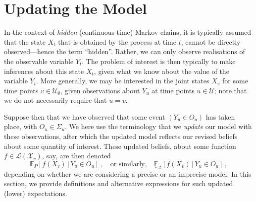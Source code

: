 \documentclass[twoside,11pt]{article}
\newcommand{\states}{\mathcal{X}}
\newcommand{\gambles}{\mathcal{L}}
\begin{document}
\section{Updating the Model}\label{sec:updating_model}

In the context of \emph{hidden} (continuous-time) Markov chains, it is typically assumed that the state $X_t$ that is obtained by the process at time $t$, cannot be directly observed---hence the term ``hidden''. Rather, we can only observe realisations of the observable variable $Y_t$. The problem of interest is then typically to make inferences about this state $X_t$, given what we know about the value of the variable $Y_t$. More generally, we may be interested in the joint states $X_v$ for some time points $v\in\mathcal{U}_\emptyset$, given observations about $Y_u$ at time points $u\in\mathcal{U}$; note that we do not necessarily require that $u=v$.

Suppose then that we have observed that some event $(Y_u\in O_u)$ has taken place, with $O_u\in\Sigma_u$. We here use the terminology that we \emph{update} our model with these observations, after which the updated model reflects our revised beliefs about some quantity of interest. These updated beliefs, about some function $f\in\gambles(\states_v)$, say, are then denoted
\begin{equation*}
\mathbb{E}_P[f(X_v)\,\vert\,Y_u\in O_u]\,,\quad\text{or similarly,}\quad\underline{\mathbb{E}}_\mathcal{Z}[f(X_v)\,\vert\,Y_u\in O_u]\,,
\end{equation*}
depending on whether we are considering a precise or an imprecise model. In this section, we provide definitions and alternative expressions for such updated (lower) expectations.


\end{document}
